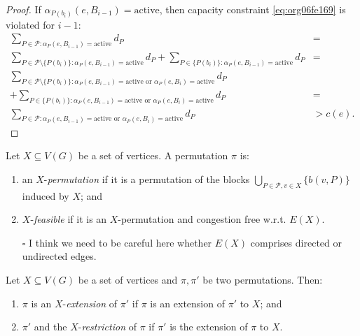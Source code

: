 \documentclass[fontsize=11pt,paper=a4]{book}
\begin{document}
\begin{proof}
If \(\alpha_{P(b_i)}(e,B_{i-1})=\mathrm{active}\), then capacity constraint \ref{eq:org06fe169} is violated for \(i-1\):
\begin{align*}
\sum_{P\in\mathcal{P}:\alpha_P(e,B_{i-1})=\mathrm{active}}d_P&=\\
\sum_{P\in\mathcal{P}\setminus\{P(b_i)\}:\alpha_P(e,B_{i-1})=\mathrm{active}}d_P+\sum_{P\in\{P(b_i)\}:\alpha_P(e,B_{i-1})=\mathrm{active}}d_P&=\\
\sum_{P\in\mathcal{P}\setminus\{P(b_i)\}:\alpha_P(e,B_{i-1})=\mathrm{active}\text{ or }\alpha_P(e,B_i)=\mathrm{active}}d_P&\\
+\sum_{P\in\{P(b_i)\}:\alpha_P(e,B_{i-1})=\mathrm{active}\text{ or }\alpha_P(e,B_i)=\mathrm{active}}d_P&=\\
\sum_{P\in\mathcal{P}:\alpha_P(e,B_{i-1})=\mathrm{active}\text{ or }\alpha_P(e,B_i)=\mathrm{active}}d_P&>
c(e).
\end{align*}
\end{proof}

\begin{defn}
Let \(X\subseteq V(G)\) be a set of vertices.
A permutation \(\pi\) is:

\begin{enumerate}
\item an \(X\)-\emph{permutation} if it is a permutation of the blocks \(\bigcup_{P\in\mathcal{P},v\in X}\{b(v,P)\}\) induced by \(X\); and

\item \(X\)-\emph{feasible} if it is an \(X\)-permutation and congestion free w.r.t. \(E(X)\).
\end{enumerate}
\end{defn}

\begin{itemize}
\item[{$\square$}] I think we need to be careful here whether \(E(X)\) comprises directed or undirected edges.
\end{itemize}

\begin{defn}
Let \(X\subseteq V(G)\) be a set of vertices and \(\pi,\pi'\) be two permutations.
Then:

\begin{enumerate}
\item \(\pi\) is an \(X\)-\emph{extension} of \(\pi'\) if \(\pi\) is an extension of \(\pi'\) to \(X\); and

\item \(\pi'\) and the \(X\)-\emph{restriction} of \(\pi\) if \(\pi'\) is the extension of \(\pi\) to \(X\).
\end{enumerate}
\end{defn}
\end{document}
